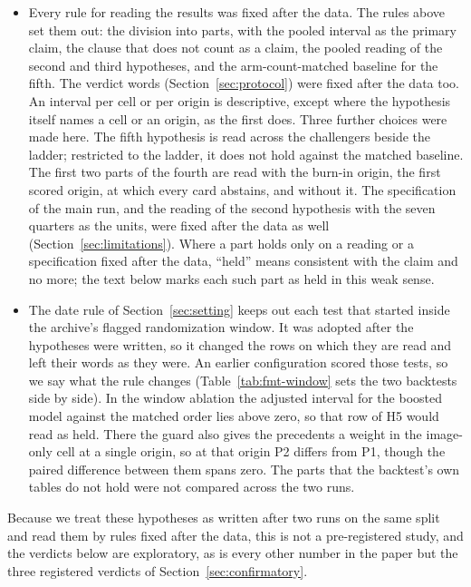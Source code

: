 \begin{itemize}
\item Every rule for reading the results was fixed after the data. The rules above set them out: the division into parts, with the pooled interval as the primary claim, the clause that does not count as a claim, the pooled reading of the second and third hypotheses, and the arm-count-matched baseline for the fifth. The verdict words (Section~\ref{sec:protocol}) were fixed after the data too. An interval per cell or per origin is descriptive, except where the hypothesis itself names a cell or an origin, as the first does. Three further choices were made here. The fifth hypothesis is read across the challengers beside the ladder; restricted to the ladder, it does not hold against the matched baseline. The first two parts of the fourth are read with the burn-in origin, the first scored origin, at which every card abstains, and without it. The specification of the main run, and the reading of the second hypothesis with the seven quarters as the units, were fixed after the data as well (Section~\ref{sec:limitations}). Where a part holds only on a reading or a specification fixed after the data, ``held'' means consistent with the claim and no more; the text below marks each such part as held in this weak sense.
\item The date rule of Section~\ref{sec:setting} keeps out each test that started inside the archive's flagged randomization window. It was adopted after the hypotheses were written, so it changed the rows on which they are read and left their words as they were. An earlier configuration scored those tests, so we say what the rule changes (Table~\ref{tab:fmt-window} sets the two backtests side by side). In the window ablation the adjusted interval for the boosted model against the matched order lies above zero, so that row of H5 would read as held. There the guard also gives the precedents a weight in the image-only cell at a single origin, so at that origin P2 differs from P1, though the paired difference between them spans zero. The parts that the backtest's own tables do not hold were not compared across the two runs.
\end{itemize}
Because we treat these hypotheses as written after two runs on the same split and read them by rules fixed after the data, this is not a pre-registered study, and the verdicts below are exploratory, as is every other number in the paper but the three registered verdicts of Section~\ref{sec:confirmatory}.

